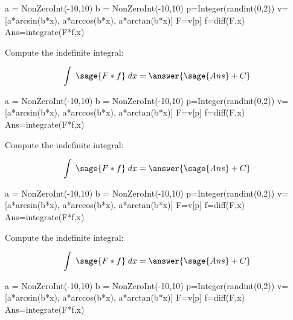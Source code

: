\documentclass[]{ximera}
\begin{document}

\renewcommand{\latexProblemContent}[1]{#1}


\begin{sagesilent}
a = NonZeroInt(-10,10)
b = NonZeroInt(-10,10)
p=Integer(randint(0,2))
v=[a*arcsin(b*x), a*arccos(b*x), a*arctan(b*x)]
F=v[p]
f=diff(F,x)
Ans=integrate(F*f,x)
\end{sagesilent}

\latexProblemContent{
\begin{problem}

Compute the indefinite integral:



\[\int\;\sage{F*f}\;dx = \answer{\sage{Ans}+C}\]
\end{problem}}%

\begin{sagesilent}
a = NonZeroInt(-10,10)
b = NonZeroInt(-10,10)
p=Integer(randint(0,2))
v=[a*arcsin(b*x), a*arccos(b*x), a*arctan(b*x)]
F=v[p]
f=diff(F,x)
Ans=integrate(F*f,x)
\end{sagesilent}

\latexProblemContent{
\begin{problem}

Compute the indefinite integral:



\[\int\;\sage{F*f}\;dx = \answer{\sage{Ans}+C}\]
\end{problem}}%

\begin{sagesilent}
a = NonZeroInt(-10,10)
b = NonZeroInt(-10,10)
p=Integer(randint(0,2))
v=[a*arcsin(b*x), a*arccos(b*x), a*arctan(b*x)]
F=v[p]
f=diff(F,x)
Ans=integrate(F*f,x)
\end{sagesilent}

\latexProblemContent{
\begin{problem}

Compute the indefinite integral:



\[\int\;\sage{F*f}\;dx = \answer{\sage{Ans}+C}\]
\end{problem}}%

\begin{sagesilent}
a = NonZeroInt(-10,10)
b = NonZeroInt(-10,10)
p=Integer(randint(0,2))
v=[a*arcsin(b*x), a*arccos(b*x), a*arctan(b*x)]
F=v[p]
f=diff(F,x)
Ans=integrate(F*f,x)
\end{sagesilent}
\end{document}
